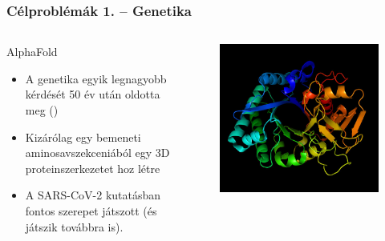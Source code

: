 \begin{frame}
\frametitle{Célproblémák 1. -- Genetika}

\begin{columns}
\begin{column}{0.45\textwidth}
	\begin{block}{AlphaFold}
		\begin{itemize}
			\item A genetika egyik legnagyobb kérdését 50 év után oldotta meg ()
			\item Kizárólag egy bemeneti aminosavszekceniából egy 3D proteinszerkezetet hoz létre
			\item A SARS-CoV-2 kutatásban fontos szerepet játszott (és játszik továbbra is).
		\end{itemize}
	\end{block}
\end{column}
\begin{column}{0.45\textwidth}
\begin{figure}
	\includegraphics[width=1.0\textwidth]{img/probs1-alphafold.jpg}
\end{figure}
\end{column}
\end{columns}

\end{frame}
